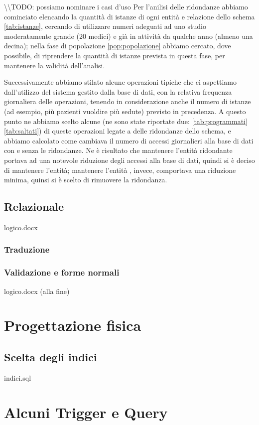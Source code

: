\documentclass[11pt,a4paper]{article}
\begin{document}
\textbackslash\textbackslash TODO: possiamo nominare i casi d'uso
Per l'anilisi delle ridondanze abbiamo cominciato elencando la quantità di istanze di ogni entità e relazione dello schema \ref{tab:istanze}, cercando di utilizzare numeri adeguati ad uno studio moderatamente grande (20 medici) e già in attività da qualche anno (almeno una decina); nella fase di popolazione \ref{pop:popolazione} abbiamo cercato, dove possibile, di riprendere la quantità di istanze prevista in questa fase, per mantenere la validità dell'analisi.

Successivamente abbiamo stilato alcune operazioni tipiche che ci aspettiamo dall'utilizzo del sistema gestito dalla base di dati, con la relativa frequenza giornaliera delle operazioni, tenendo in considerazione anche il numero di istanze (ad esempio, più pazienti vuoldire più sedute) previsto in precedenza. A questo punto ne abbiamo scelto alcune (ne sono state riportate due: \ref{tab:programmati} \ref{tab:saltati}) di queste operazioni legate a delle ridondanze dello schema, e abbiamo calcolato come cambiava il numero di accessi giornalieri alla base di dati con e senza le ridondanze. Ne è risultato che mantenere l'entità ridondante  portava ad una notevole riduzione degli accessi alla base di dati, quindi si è deciso di mantenere l'entità; mantenere l'entità , invece, comportava una riduzione minima, quinsi si è scelto di rimuovere la ridondanza.

\subsection{Relazionale}
logico.docx
\subsubsection{Traduzione}
\subsubsection{Validazione e forme normali}
logico.docx (alla fine)


\section{Progettazione fisica}
\subsection{Scelta degli indici}
indici.sql


\section{Alcuni Trigger e Query}
\end{document}
